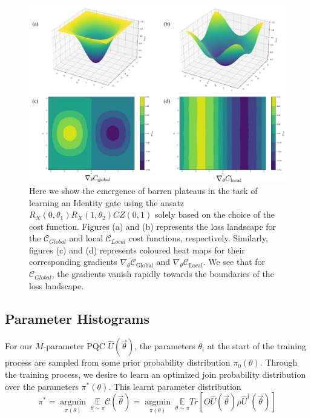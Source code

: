 \documentclass[%
 reprint,
 amsmath,
 amssymb,
 showkeys,
 pra,
 floatfix,
]{revtex4-2}
\begin{document}
\begin{figure}[ht]
    \centering
    \includegraphics[width=\linewidth]{images/barren-plateau.pdf}
    \caption[Presence of barren plateaus in parameterized quantum circuits]{Here we show the emergence of barren plateaus in the task of learning an Identity gate using the ansatz $R_X(0,\theta_1)R_X(1, \theta_2)CZ(0, 1)$ solely based on the choice of the cost function. Figures (a) and (b) represents the loss landscape for the $\mathcal{C}_{Global}$ and local $\mathcal{C}_{Local}$ cost functions, respectively. Similarly, figures (c) and (d) represents coloured heat maps for their  corresponding gradients $\nabla_{\theta}\mathcal{C}_{\text{Global}}$ and $\nabla_{\theta}\mathcal{C}_{\text{Local}}$. We see that for $\mathcal{C}_{Global}$, the gradients vanish rapidly towards the boundaries of the loss landscape.}
    \label{fig:barren-plateau}
\end{figure}


\subsection{Parameter Histograms}

For our $M$-parameter PQC $\hat{U}(\vec{\theta})$, the parameters $\theta_i$ at the start of the training process are sampled from some prior probability distribution $\pi_0(\theta)$. Through the training process, we desire to learn an optimized join probability distribution over the parameters $\pi^*(\theta)$. This learnt parameter distribution
\begin{equation}
    \pi^* = \underset{\pi(\theta)}{\operatorname{argmin}} \; \underset{\theta \sim \pi}{\mathbb{E}} \mathcal{C}(\vec{\theta}) = \underset{\pi(\theta)}{\operatorname{argmin}} \; \underset{\theta \sim \pi}{\mathbb{E}} Tr[O \hat{U}(\vec{\theta}) \rho \hat{U}^\dagger(\vec{\theta})]
\end{equation}
\end{document}

